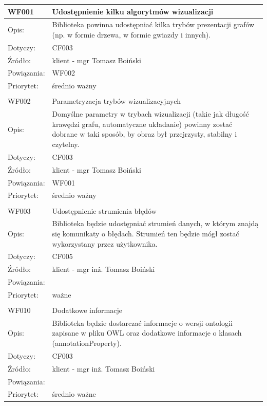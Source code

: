 \documentclass[a4paper,10pt]{article}
\begin{document}
\begin{center}

\begin{tabular}{|m{3cm}|m{9cm}|} \hline

WF001 & Udostępnienie kilku algorytmów wizualizacji \\ \hline
Opis: & Biblioteka powinna udostępniać kilka trybów prezentacji grafów (np. w formie drzewa, w formie gwiazdy i innych).    \\ \hline
Dotyczy: & CF003 \\ \hline
Źródło: & klient - mgr Tomasz Boiński \\ \hline
Powiązania: &WF002 \\ \hline
Priorytet: & średnio ważny\\ \hline

\multicolumn{2}{c}{} \\
 \hline

WF002 & Parametryzacja trybów wizualizacyjnych \\ \hline
Opis: & Domyślne parametry w trybach wizualizacji (takie jak długość krawędzi grafu, automatyczne układanie) powinny zostać dobrane w taki sposób, by obraz był przejrzysty, stabilny i czytelny.    \\ \hline
Dotyczy: & CF003 \\ \hline
Źródło: &  klient - mgr Tomasz Boiński\\ \hline
Powiązania: & WF001 \\ \hline
Priorytet: & średnio ważny \\ \hline

\multicolumn{2}{c}{} \\
 \hline

WF003 & Udostępnienie strumienia błędów \\ \hline
Opis: &   Biblioteka będzie udostępniać strumień danych, w którym znajdą się komunikaty o błędach. Strumień ten będzie mógł zostać wykorzystany przez użytkownika. \\ \hline
Dotyczy: &  CF005  \\ \hline
Źródło: & klient - mgr inż. Tomasz Boiński \\ \hline
Powiązania: & \\ \hline
Priorytet: & ważne \\ \hline

\multicolumn{2}{c}{} \\
 \hline

WF010 & Dodatkowe informacje \\ \hline
Opis: &   Biblioteka będzie dostarczać informacje o wersji ontologii zapisane w pliku OWL oraz dodatkowe informacje o klasach (annotationProperty). \\ \hline
Dotyczy: &  CF003  \\ \hline
Źródło: & klient - mgr inż. Tomasz Boiński \\ \hline
Powiązania: & \\ \hline
Priorytet: & średnio ważne \\ \hline

\end{tabular}

\end{center}
\end{document}
